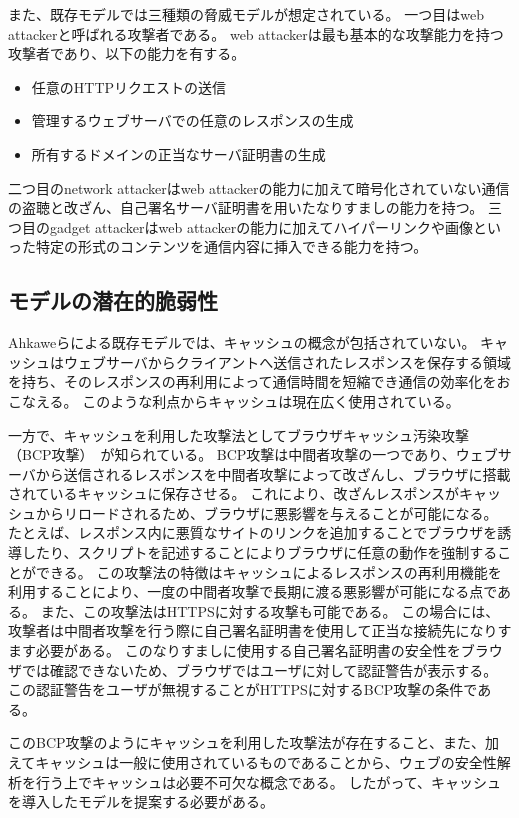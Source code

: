\documentclass{css}
\begin{document}
また、既存モデルでは三種類の脅威モデルが想定されている。
一つ目はweb attackerと呼ばれる攻撃者である。
web attackerは最も基本的な攻撃能力を持つ攻撃者であり、以下の能力を有する。
\begin{itemize}
\item 任意のHTTPリクエストの送信
\item 管理するウェブサーバでの任意のレスポンスの生成
\item 所有するドメインの正当なサーバ証明書の生成
\end{itemize}
二つ目のnetwork attackerはweb attackerの能力に加えて暗号化されていない通信の盗聴と改ざん、自己署名サーバ証明書を用いたなりすましの能力を持つ。
三つ目のgadget attackerはweb attackerの能力に加えてハイパーリンクや画像といった特定の形式のコンテンツを通信内容に挿入できる能力を持つ。

\subsection{モデルの潜在的脆弱性}
\label{sec:problem}
Ahkaweらによる既存モデル\cite{webmodel}では、キャッシュの概念が包括されていない。
キャッシュはウェブサーバからクライアントへ送信されたレスポンスを保存する領域を持ち、そのレスポンスの再利用によって通信時間を短縮でき通信の効率化をおこなえる。
このような利点からキャッシュは現在広く使用されている。

一方で、キャッシュを利用した攻撃法としてブラウザキャッシュ汚染攻撃（BCP攻撃）~\cite{bcpattack}が知られている。
BCP攻撃は中間者攻撃の一つであり、ウェブサーバから送信されるレスポンスを中間者攻撃によって改ざんし、ブラウザに搭載されているキャッシュに保存させる。
これにより、改ざんレスポンスがキャッシュからリロードされるため、ブラウザに悪影響を与えることが可能になる。
たとえば、レスポンス内に悪質なサイトのリンクを追加することでブラウザを誘導したり、スクリプトを記述することによりブラウザに任意の動作を強制することができる。
この攻撃法の特徴はキャッシュによるレスポンスの再利用機能を利用することにより、一度の中間者攻撃で長期に渡る悪影響が可能になる点である。
また、この攻撃法はHTTPSに対する攻撃も可能である。
この場合には、攻撃者は中間者攻撃を行う際に自己署名証明書を使用して正当な接続先になりすます必要がある。
このなりすましに使用する自己署名証明書の安全性をブラウザでは確認できないため、ブラウザではユーザに対して認証警告が表示する。
この認証警告をユーザが無視することがHTTPSに対するBCP攻撃の条件である。

このBCP攻撃のようにキャッシュを利用した攻撃法が存在すること、また、加えてキャッシュは一般に使用されているものであることから、ウェブの安全性解析を行う上でキャッシュは必要不可欠な概念である。
したがって、キャッシュを導入したモデルを提案する必要がある。
\end{document}
